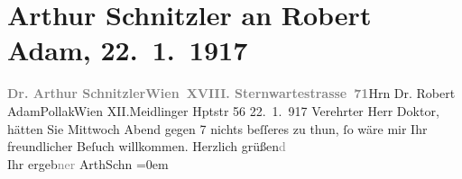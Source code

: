 

               \section[Arthur Schnitzler an Robert Adam, 22. 1. 1917]{ Arthur Schnitzler an Robert Adam, 22. 1. 1917}\nopagebreak{}\rehead{ }\begin{ledgroupsized}[t]{13cm}\normalsize\beginnumbering{} \toendnotes[C]{\smallbreak\pagebreak[2]} 
\pstart{}{\pb}\textcolor{gray}{\textbf{Dr. Arthur Schnitzler}}\pend{}\pstart{}\textcolor{gray}{\textbf{Wien XVIII. Sternwartestrasse 71}}\pend{}{\bigskip}\pstart{}Hrn Dr. Robert Adam\pend{}\pstart{}Pollak\pend{}\pstart{}Wien XII.\pend{}\pstart{}Meidlinger Hptstr 56\pend{}{\bigskip}\pstart
           \raggedleft{}{\pb}22. 1. 917\pend
           \pstart{}Verehrter Herr Doktor, \pend\pstart
           hätten Sie Mittwoch{ }Abend gegen 7 nichts beſſeres zu thun, ſo wäre mir Ihr freundlicher
                    Beſuch willkommen.\pend
           \pstart
           Herzlich grüßen\textcolor{gray}{d}{\\[\baselineskip]}Ihr ergeb\textcolor{gray}{ner}{ }\spacefill\mbox{ArthSchn}\pend
           \leftskip=0em{}\endnumbering{}\end{ledgroupsized}  \newcommand{\dateiname}{L02253}\newcommand{\titel}{Arthur Schnitzler an Robert Adam, 22. 1. 1917}\newcommand{\editorInnen}{Martin Anton Müller und Gerd-Hermann Susen}
      